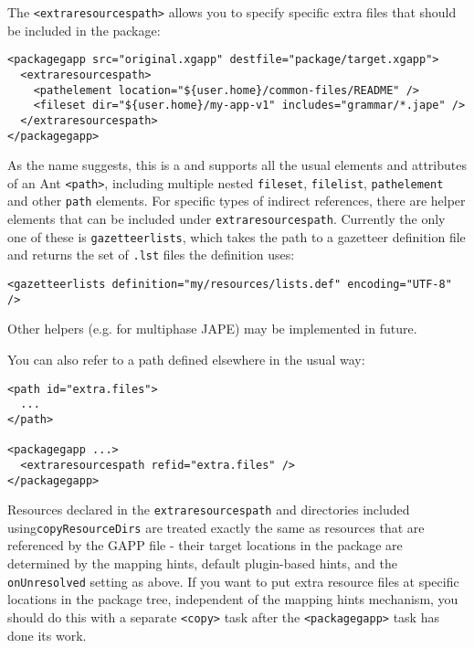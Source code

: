 The \verb|<extraresourcespath>| allows you to specify specific extra files that should be included in the package:

\begin{small}
\begin{verbatim}
<packagegapp src="original.xgapp" destfile="package/target.xgapp">
  <extraresourcespath>
    <pathelement location="${user.home}/common-files/README" />
    <fileset dir="${user.home}/my-app-v1" includes="grammar/*.jape" />
  </extraresourcespath>
</packagegapp>
\end{verbatim}
\end{small}

As the name suggests, this is a
 and
supports all the usual elements and attributes of an Ant \verb|<path>|,
including multiple nested \texttt{fileset}, \texttt{filelist},
\texttt{pathelement} and other \texttt{path} elements.  For specific types of
indirect references, there are helper elements that can be included under
\texttt{extraresourcespath}.  Currently the only one of these is
\texttt{gazetteerlists}, which takes the path to a gazetteer definition file
and returns the set of \texttt{.lst} files the definition uses:
\begin{verbatim}
<gazetteerlists definition="my/resources/lists.def" encoding="UTF-8" />
\end{verbatim}
Other helpers (e.g. for multiphase JAPE) may be implemented in future.

You can also refer to a path defined elsewhere in the usual way:

\begin{small}
\begin{verbatim}
<path id="extra.files">
  ...
</path>

<packagegapp ...>
  <extraresourcespath refid="extra.files" />
</packagegapp>
\end{verbatim}
\end{small}

Resources declared in the \texttt{extraresourcespath} and directories included
using\linebreak \verb|copyResourceDirs| are treated exactly the same as resources that
are referenced by the GAPP file - their target locations in the package are
determined by the mapping hints, default plugin-based hints, and the
\texttt{onUnresolved} setting as above.  If you want to put extra resource
files at specific locations in the package tree, independent of the mapping
hints mechanism, you should do this with a separate \verb|<copy>| task after
the \verb|<packagegapp>| task has done its work.

